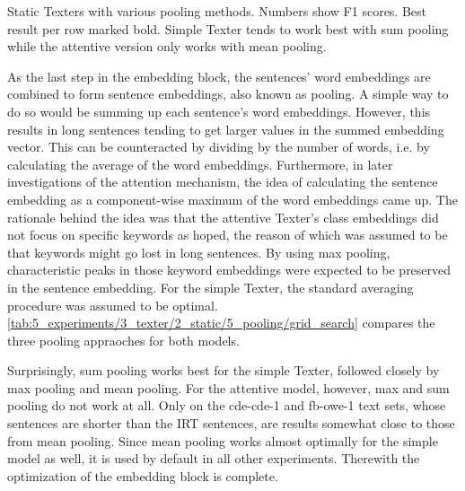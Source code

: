 \begin{table}[h]
    \centering
    
    \caption{Static Texters with various pooling methods. Numbers show F1 scores. Best result per row marked bold. Simple Texter tends to work best with sum pooling while the attentive version only works with mean pooling.}
    \label{tab:5_experiments/3_texter/2_static/5_pooling/grid_search}
\end{table}

As the last step in the embedding block, the sentences' word embeddings are combined to form sentence embeddings, also known as pooling. A simple way to do so would be summing up each sentence's word embeddings. However, this results in long sentences tending to get larger values in the summed embedding vector. This can be counteracted by dividing by the number of words, i.e. by calculating the average of the word embeddings. Furthermore, in later investigations of the attention mechanism, the idea of calculating the sentence embedding as a component-wise maximum of the word embeddings came up. The rationale behind the idea was that the attentive Texter's class embeddings did not focus on specific keywords as hoped, the reason of which was assumed to be that keywords might go lost in long sentences. By using max pooling, characteristic peaks in those keyword embeddings were expected to be preserved in the sentence embedding. For the simple Texter, the standard averaging procedure was assumed to be optimal. \autoref{tab:5_experiments/3_texter/2_static/5_pooling/grid_search} compares the three pooling appraoches for both models.

Surprisingly, sum pooling works best for the simple Texter, followed closely by max pooling and mean pooling. For the attentive model, however, max and sum pooling do not work at all. Only on the cde-cde-1 and fb-owe-1 text sets, whose sentences are shorter than the IRT sentences, are results somewhat close to those from mean pooling. Since mean pooling works almost optimally for the simple model as well, it is used by default in all other experiments. Therewith the optimization of the embedding block is complete.
